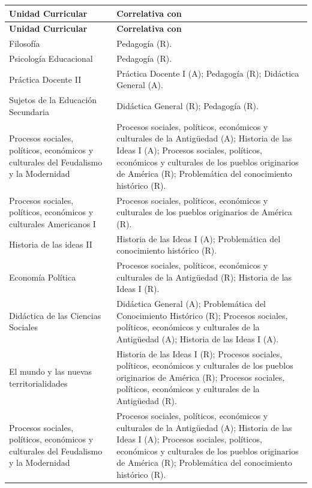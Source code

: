 \thispagestyle{empty}
\PageDecor{\CorrPageNo}

\begingroup
\small
\setlength{\tabcolsep}{4.5pt}
\renewcommand{\arraystretch}{1.34}
\setlength{\LTleft}{0pt}
\setlength{\LTright}{0pt}
\setlength{\LTpre}{0.35em}
\setlength{\LTpost}{0.75em}

\newcommand{\CorrTableStart}{
\begin{longtable}{|>{\RaggedRight\arraybackslash}p{0.30\textwidth}|>{\RaggedRight\arraybackslash}p{0.64\textwidth}|}
\hline
\textbf{Unidad Curricular} & \textbf{Correlativa con} \\
\hline
\endfirsthead
\hline
\textbf{Unidad Curricular} & \textbf{Correlativa con} \\
\hline
\endhead
}

\newcommand{\CorrTableEnd}{
\end{longtable}
}

\newcommand{\CorrRow}[2]{
\rule{0pt}{2.55ex}#1 & #2 \\
\hline
}

\CorrTableStart
\CorrRow{Filosofía}{Pedagogía (R).}
\CorrRow{Psicología Educacional}{Pedagogía (R).}
\CorrRow{Práctica Docente II}{Práctica Docente I (A); Pedagogía (R); Didáctica General (A).}
\CorrRow{Sujetos de la Educación Secundaria}{Didáctica General (R); Pedagogía (R).}
\CorrRow{Procesos sociales, políticos, económicos y culturales del Feudalismo y la Modernidad}{Procesos sociales, políticos, económicos y culturales de la Antigüedad (A); Historia de las Ideas I (A); Procesos sociales, políticos, económicos y culturales de los pueblos originarios de América (R); Problemática del conocimiento histórico (R).}
\CorrRow{Procesos sociales, políticos, económicos y culturales Americanos I}{Procesos sociales, políticos, económicos y culturales de los pueblos originarios de América (R).}
\CorrRow{Historia de las ideas II}{Historia de las Ideas I (A); Problemática del conocimiento histórico (R).}
\CorrRow{Economía Política}{Procesos sociales, políticos, económicos y culturales de la Antigüedad (R); Historia de las Ideas I (R).}
\CorrRow{Didáctica de las Ciencias Sociales}{Didáctica General (A); Problemática del Conocimiento Histórico (R); Procesos sociales, políticos, económicos y culturales de la Antigüedad (A); Historia de las Ideas I (A).}
\CorrRow{El mundo y las nuevas territorialidades}{Historia de las Ideas I (R); Procesos sociales, políticos, económicos y culturales de los pueblos originarios de América (R); Procesos sociales, políticos, económicos y culturales de la Antigüedad (R).}
\CorrRow{Procesos sociales, políticos, económicos y culturales del Feudalismo y la Modernidad}{Procesos sociales, políticos, económicos y culturales de la Antigüedad (A); Historia de las Ideas I (A); Procesos sociales, políticos, económicos y culturales de los pueblos originarios de América (R); Problemática del conocimiento histórico (R).}
\CorrTableEnd


